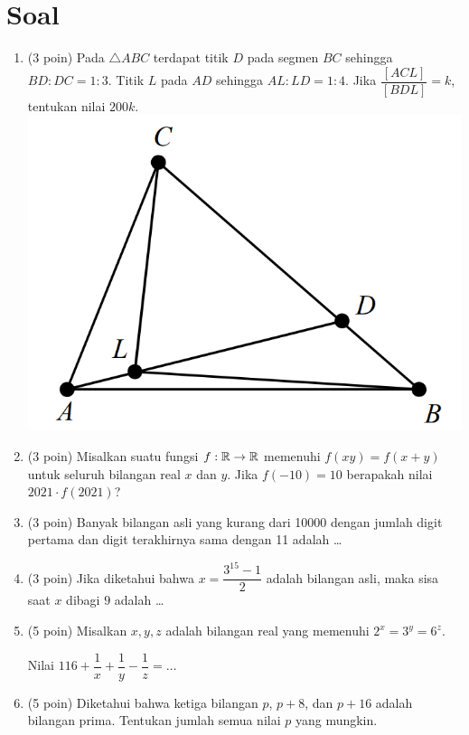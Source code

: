 \documentclass[11pt]{scrartcl}
\begin{document}
	\section{Soal}
	\begin{enumerate}
	    \item (3 poin) Pada $\triangle ABC$ terdapat titik $D$ pada segmen $BC$ sehingga $BD:DC=1:3$. Titik $L$ pada $AD$ sehingga $AL:LD=1:4$. Jika $\dfrac{[ACL]}{[BDL]}=k$, tentukan nilai $200k$.
	    \includegraphics[scale=0.5]{geogampang.PNG}
	    
	    \item (3 poin) Misalkan suatu fungsi $f:\mathbb R \rightarrow \mathbb R$ memenuhi $f(xy)=f(x+y)$ untuk seluruh bilangan real $x$ dan $y$. Jika $f(-10)=10$ berapakah nilai $2021\cdot f(2021)$?
	    
	    \item (3 poin) Banyak bilangan asli yang kurang dari 10000 dengan jumlah digit pertama dan digit terakhirnya sama dengan 11 adalah \dots
	    
	    \item (3 poin) Jika diketahui bahwa $x=\dfrac{3^{15}-1}{2}$ adalah bilangan asli, maka sisa saat $x$ dibagi $9$ adalah \dots
	    
	    
	    \item (5 poin) Misalkan $x,y,z$ adalah bilangan real yang memenuhi $2^x=3^y=6^z.$
	    
	    Nilai $116+\dfrac{1}{x}+\dfrac{1}{y}-\dfrac{1}{z}=\dots$
	    
	    \item (5 poin) Diketahui bahwa ketiga bilangan $p$, $p+8$, dan $p+16$ adalah bilangan prima. Tentukan jumlah semua nilai $p$ yang mungkin.
	    

\end{enumerate}
\end{document}
